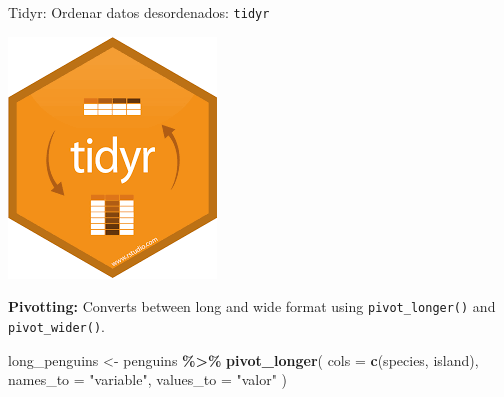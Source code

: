 \documentclass[
  ignorenonframetext,
  aspectratio=169]{beamer}
\newenvironment{Shaded}{\begin{snugshade}}{\end{snugshade}}
\newcommand{\AttributeTok}[1]{\textcolor[rgb]{0.13,0.29,0.53}{#1}}
\newcommand{\FunctionTok}[1]{\textcolor[rgb]{0.13,0.29,0.53}{\textbf{#1}}}
\newcommand{\NormalTok}[1]{#1}
\newcommand{\OtherTok}[1]{\textcolor[rgb]{0.56,0.35,0.01}{#1}}
\newcommand{\SpecialCharTok}[1]{\textcolor[rgb]{0.81,0.36,0.00}{\textbf{#1}}}
\newcommand{\StringTok}[1]{\textcolor[rgb]{0.31,0.60,0.02}{#1}}
\begin{document}
\begin{frame}[fragile]{Tidyr: Ordenar datos desordenados:
\texttt{tidyr}}
\label{tidyr-ordenar-datos-desordenados-tidyr-1}
\begin{flushright}\includegraphics[width=0.05\linewidth]{Imgs/logo_tidyr} \end{flushright}

\textbf{Pivotting:} Converts between long and wide format using
\texttt{pivot\_longer()} and \texttt{pivot\_wider()}.

\begin{Shaded}
\begin{Highlighting}[]
\NormalTok{long\_penguins }\OtherTok{\textless{}{-}}\NormalTok{ penguins }\SpecialCharTok{\%\textgreater{}\%} 
  \FunctionTok{pivot\_longer}\NormalTok{(}
    \AttributeTok{cols =} \FunctionTok{c}\NormalTok{(species, island),}
    \AttributeTok{names\_to =} \StringTok{"variable"}\NormalTok{, }\AttributeTok{values\_to =} \StringTok{"valor"}
\NormalTok{  )}
\end{Highlighting}
\end{Shaded}
\end{frame}
\end{document}
